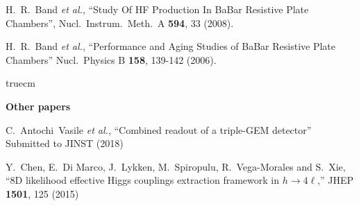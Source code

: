   H.~R.~Band {\it et al.},
  ``Study Of HF Production In BaBar Resistive Plate Chambers'',
  Nucl.\ Instrum.\ Meth.\  A {\bf 594}, 33 (2008).

  H.~R.~Band {\it et al.},
  ``Performance and Aging Studies of BaBar Resistive Plate Chambers''
  Nucl.\ Physics B {\bf 158}, 139-142 (2006).

 truecm

{\bf Other papers}

  C.~Antochi~Vasile {\it et al.},
  ``Combined readout of a triple-GEM detector''
  Submitted to JINST (2018)

  Y.~Chen, E.~Di Marco, J.~Lykken, M.~Spiropulu, R.~Vega-Morales and S.~Xie,
  ``8D likelihood effective Higgs couplings extraction framework in $h \to 4\ell$,''
  JHEP {\bf 1501}, 125 (2015)

